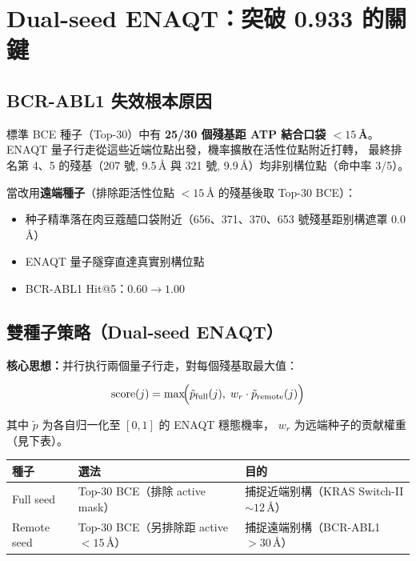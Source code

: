 \documentclass[11pt, a4paper]{article}
\begin{document}
\section{Dual-seed ENAQT：突破 0.933 的關鍵}
\label{sec:dual}

\subsection{BCR-ABL1 失效根本原因}

標準 BCE 種子（Top-30）中有 \textbf{25/30 個殘基距 ATP 結合口袋 $<15$\,\AA{}}。
ENAQT 量子行走從這些近端位點出發，機率擴散在活性位點附近打轉，
最終排名第 4、5 的殘基（207 號, 9.5\,\AA{} 與 321 號, 9.9\,\AA{}）均非别構位點（命中率 3/5）。

當改用\textbf{遠端種子}（排除距活性位點 $<15$\,\AA{} 的殘基後取 Top-30 BCE）：
\begin{itemize}
  \item 种子精準落在肉豆蔻醯口袋附近（656、371、370、653 號殘基距别構遮罩 0.0\,\AA{}）
  \item ENAQT 量子隧穿直達真實别構位點
  \item BCR-ABL1 Hit@5：$0.60 \to \mathbf{1.00}$
\end{itemize}

\subsection{雙種子策略（Dual-seed ENAQT）}

\textbf{核心思想：}并行执行兩個量子行走，對每個殘基取最大值：

\[
  \text{score}(j) = \max\!\Bigl(\tilde{p}_{\text{full}}(j),\; w_r \cdot \tilde{p}_{\text{remote}}(j)\Bigr)
\]

其中 $\tilde{p}$ 为各自归一化至 $[0,1]$ 的 ENAQT 穩態機率，
$w_r$ 为远端种子的贡献權重（見下表）。

\begin{table}[H]
\centering
\begin{tabular}{lll}
\toprule
\textbf{種子} & \textbf{選法} & \textbf{目的} \\
\midrule
Full seed   & Top-30 BCE（排除 active mask） & 捕捉近端别構（KRAS Switch-II $\sim12$\,\AA{}）\\
Remote seed & Top-30 BCE（另排除距 active $<15$\,\AA{}） & 捕捉遠端别構（BCR-ABL1 $>30$\,\AA{}）\\
\bottomrule
\end{tabular}
\end{table}
\end{document}
